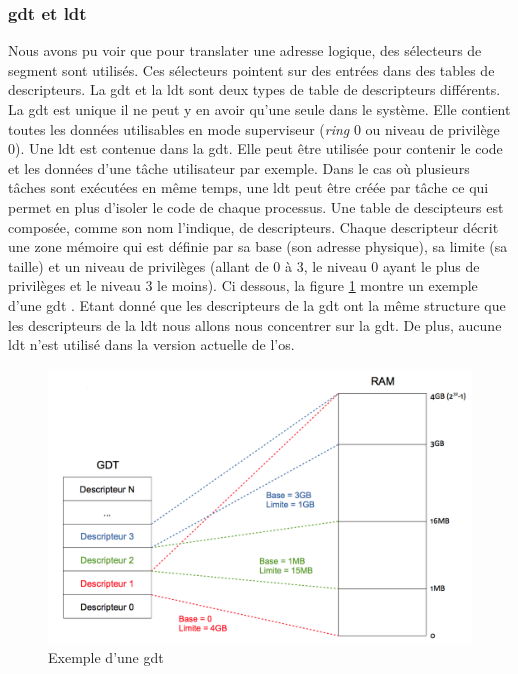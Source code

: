 
\subsubsection{\acrshort{gdt} et \acrshort{ldt}}
\label{gdt_ldt}
Nous avons pu voir que pour translater une adresse logique, des sélecteurs de
segment sont utilisés. Ces sélecteurs pointent sur des entrées dans des tables
de descripteurs. La \acrshort{gdt} et la \acrshort{ldt} sont deux types de table 
de descripteurs différents. La \acrshort{gdt} est unique il ne peut y en avoir
qu'une seule dans le système. Elle contient toutes les données utilisables en mode
superviseur (\textit{ring} 0 ou niveau de privilège 0). Une \acrshort{ldt} est
contenue dans la \acrshort{gdt}. Elle peut être utilisée pour contenir le code
et les données d'une tâche utilisateur par exemple. Dans le cas où plusieurs tâches
sont exécutées en même temps, une \acrshort{ldt} peut être créée par tâche ce qui
permet en plus d'isoler le code de chaque processus. Une table de descipteurs
est composée, comme son nom l'indique, de descripteurs. Chaque descripteur décrit
une zone mémoire qui est définie par sa base (son adresse physique), sa limite (sa taille)
et un niveau de privilèges (allant de 0 à 3, le niveau 0 ayant le plus de privilèges
et le niveau 3 le moins). Ci dessous, la figure \ref{gdt} montre un exemple d'une
\acrshort{gdt} \cite{ref42}. Etant donné que les descripteurs de la \acrshort{gdt}
ont la même structure que les descripteurs de la \acrshort{ldt} nous allons nous
concentrer sur la \acrshort{gdt}. De plus, aucune \acrshort{ldt} n'est utilisé dans
la version actuelle de l'\acrshort{os}. \\

\begin{figure}[!h]
  \centering
  \includegraphics[scale=0.75]{images/gdt.png}
  \caption{Exemple d'une \acrshort{gdt}}
  \label{gdt}
\end{figure}

